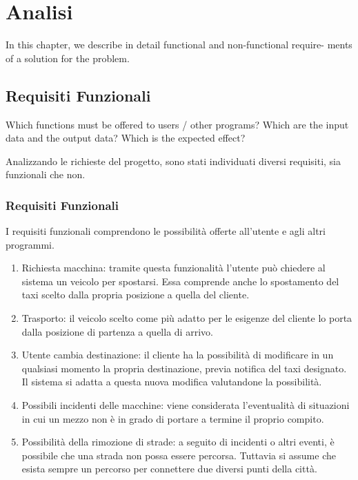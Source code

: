 
\chapter{Analisi}
In this chapter, we describe in detail functional and non-functional require-
ments of a solution for the problem.

\section{Requisiti Funzionali}\label{diocane}
Which functions must be offered to users / other programs? Which are the input data and the output data? Which is the expected effect?

Analizzando le richieste del progetto, sono stati individuati diversi requisiti, sia funzionali che non.
\subsection{Requisiti Funzionali}

I requisiti funzionali comprendono le possibilità offerte all'utente e agli altri programmi.

\begin{enumerate}
	\item Richiesta macchina: tramite questa funzionalità l'utente può chiedere al sistema un veicolo per spostarsi. Essa comprende anche lo spostamento del taxi scelto dalla propria posizione a quella del cliente.
	\item Trasporto: il veicolo scelto come più adatto per le esigenze del cliente lo porta dalla posizione di partenza a quella di arrivo.
	\item Utente cambia destinazione: il cliente ha la possibilità di modificare in un qualsiasi momento la propria destinazione, previa notifica del taxi designato. Il sistema si adatta a questa nuova modifica valutandone la possibilità.
	\item Possibili incidenti delle macchine: viene considerata l'eventualità di situazioni in cui un mezzo non è in grado di portare a termine il proprio compito.
	\item Possibilità della rimozione di strade: a seguito di incidenti o altri eventi, è possibile che una strada non possa essere percorsa. Tuttavia si assume che esista sempre un percorso per connettere due diversi punti della città.
\end{enumerate}

